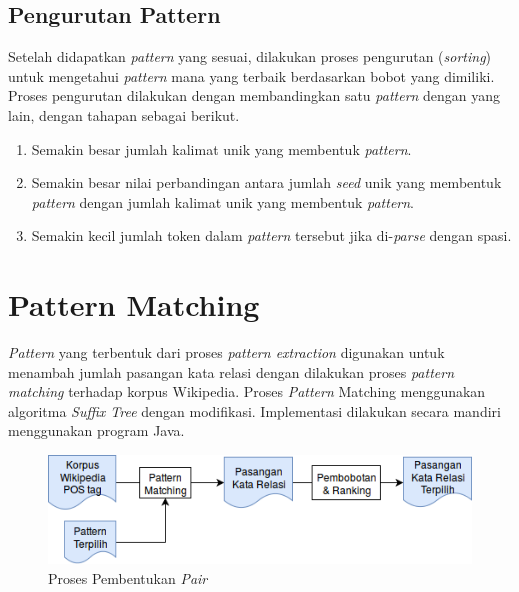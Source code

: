 \subsection{Pengurutan Pattern}
Setelah didapatkan \textit{pattern} yang sesuai, dilakukan proses pengurutan (\textit{sorting}) untuk mengetahui \textit{pattern} mana yang terbaik berdasarkan bobot yang dimiliki. Proses pengurutan dilakukan dengan membandingkan satu \textit{pattern} dengan yang lain, dengan tahapan sebagai berikut.
\begin{enumerate}
  \item Semakin besar jumlah kalimat unik yang membentuk \textit{pattern}.
  \item Semakin besar nilai perbandingan antara jumlah \textit{seed} unik yang membentuk \textit{pattern} dengan jumlah kalimat unik yang membentuk \textit{pattern}.
  \item Semakin kecil jumlah token dalam \textit{pattern} tersebut jika di-\textit{parse} dengan spasi.
\end{enumerate}


\section{Pattern Matching}
\textit{Pattern} yang terbentuk dari proses \textit{pattern extraction} digunakan untuk menambah jumlah pasangan kata relasi dengan dilakukan proses \textit{pattern matching} terhadap korpus Wikipedia. Proses \textit{Pattern} Matching menggunakan algoritma \textit{Suffix Tree} dengan modifikasi. Implementasi dilakukan secara mandiri menggunakan program Java.

\begin{figure}
    \centering
    \includegraphics[scale=0.6]{pics/Pic04-PatternMatching}
    \caption{Proses Pembentukan \textit{Pair}}
    \label{fig:pattern-matching}
\end{figure}

